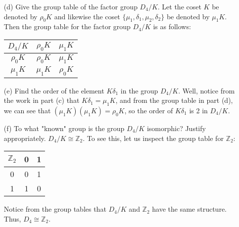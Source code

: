\documentclass{article}
\begin{document}
\begin{enumerate}
    \item[(d)] Give the group table of the factor group $D_4/K$.
    \newline\newline
    Let the coset $K$ be denoted by $\rho_0K$ and likewise the coset $\{\mu_1, \delta_1, \mu_2, \delta_2\}$ be denoted by $\mu_1K$. Then the group table for the factor group $D_4/K$ is as follows:
    \begin{center}
    \begin{tabular}{c||c|c}
        $D_4/K$ & $\rho_0K$ & $\mu_1K$ \\
         \hline\hline
        $\rho_0K$ & $\rho_0K$ & $\mu_1K$ \\
        \hline
        $\mu_1K$ & $\mu_1K$ & $\rho_0K$ \\
    \end{tabular}
    \end{center}
    \item[(e)] Find the order of the element $K\delta_1$ in the group $D_4/K$.
    \newline\newline
    Well, notice from the work in part (c) that $K\delta_1 = \mu_1K$, and from the group table in part (d), we can see that $(\mu_1K)(\mu_1K) = \rho_0K$, so the order of $K\delta_1$ is 2 in $D_4/K$.
    
    
    \item[(f)] To what "known" group is the group $D_4/K$ isomorphic? Justify appropriately.
    \newline\newline
    $D_4/K \cong \mathbb{Z}_2$. To see this, let us inspect the group table for $\mathbb{Z}_2$:
    \begin{center}
        \begin{tabular}{c||c|c}
            $\mathbb{Z}_2$ & 0 & 1 \\
             \hline\hline
            0 & 0 & 1 \\
            \hline
            1 & 1 & 0 \\
        \end{tabular}
    \end{center}
    Notice from the group tables that $D_4/K$ and $\mathbb{Z}_2$ have the same structure. Thus, $D_4 \cong \mathbb{Z}_2$.
    
\end{enumerate}
\end{document}
